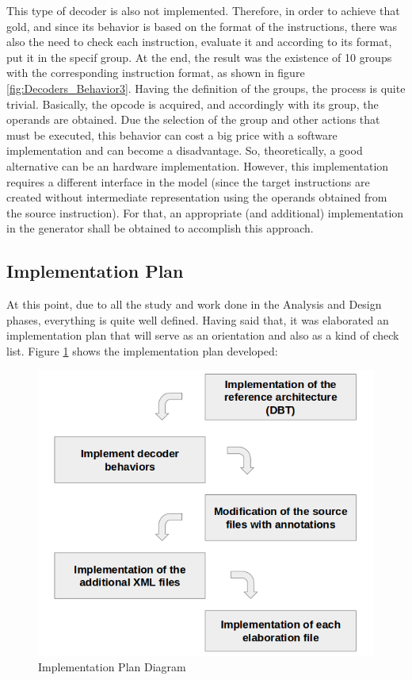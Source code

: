 \documentclass[12pt]{article}
\begin{document}
{    This type of decoder is also not implemented. Therefore, in order to achieve that gold, and since its behavior is based on the format of the instructions, there was also the need to check each instruction, evaluate it and according to its format, put it in the specif group. At the end, the result was the existence of 10 groups with the corresponding instruction format, as shown in figure \ref{fig:Decoders_Behavior3}. 
	Having the definition of the groups, the process is quite trivial. Basically, the opcode is acquired, and accordingly with its group, the operands are obtained. Due the selection of the group and other actions that must be executed, this behavior can cost a big price with a software implementation and can become a disadvantage. So, theoretically, a good alternative can be an hardware implementation. However, this implementation requires a different interface in the model (since the target instructions are created without intermediate representation using the operands obtained from the source instruction). For that, an appropriate (and additional) implementation in the generator shall be obtained to accomplish this approach. 

\subsection{Implementation Plan}
At this point, due to all the study and work done in the Analysis and Design phases, everything is quite well defined. Having said that, it was elaborated an implementation plan that will serve as an orientation and also as a kind of check list. Figure \ref{fig:implementation_plan} shows the implementation plan developed:

\begin{figure}[!htb]
\centerline{
\includegraphics[scale=0.45]{images/implementation_plan}
}
\caption{Implementation Plan Diagram}
\label{fig:implementation_plan} 
\end{figure}

}
\end{document}
